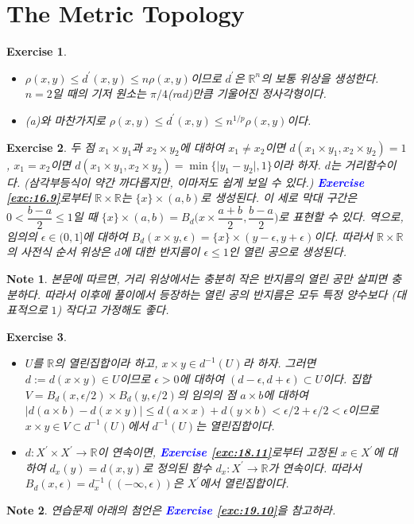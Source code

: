 \documentclass{article}
\newtheorem{exercise}{Exercise}[section]
\newtheorem*{note}{Note}
\newcommand{\R}{\mathbb{R}}
\begin{document}
\section{The Metric Topology}

\begin{exercise}
    \phantom{}
    \begin{itemize}
        \item[(a)] $\rho(x,y)\leq d^\prime(x,y)\leq n\rho(x,y)$이므로 $d^\prime$은 $\R^n$의 보통 위상을 생성한다. $n=2$일 때의 기저 원소는 $\pi/4$(rad)만큼 기울어진 정사각형이다.
        \item[(b)] (a)와 마찬가지로 $\rho(x,y)\leq d^\prime(x,y)\leq n^{1/p}\rho(x,y)$이다.
    \end{itemize}
\end{exercise}

\begin{exercise}
    두 점 $x_1\times y_1$과 $x_2\times y_2$에 대하여 $x_1\ne x_2$이면 $d(x_1\times y_1,x_2\times y_2)=1$, $x_1=x_2$이면 $d(x_1\times y_1,x_2\times y_2)=\min\{\vert y_1-y_2\vert,1\}$이라 하자. $d$는 거리함수이다. (삼각부등식이 약간 까다롭지만, 이마저도 쉽게 보일 수 있다.) \textcolor{blue}{\textbf{Exercise \ref{exc:16.9}}}로부터 $\R\times\R$는 $\{x\}\times (a,b)$로 생성된다. 이 세로 막대 구간은 $0<\dfrac{b-a}{2}\leq 1$일 때 $\{x\}\times(a,b)=B_d\biggl(x\times\dfrac{a+b}{2},\dfrac{b-a}{2}\biggr)$로 표현할 수 있다. 역으로, 임의의 $\epsilon\in(0,1]$에 대하여 $B_d(x\times y,\epsilon)=\{x\}\times(y-\epsilon,y+\epsilon)$이다. 따라서 $\R\times\R$의 사전식 순서 위상은 $d$에 대한 반지름이 $\epsilon\leq1$인 열린 공으로 생성된다.
\end{exercise}
\begin{note}
    본문에 따르면, 거리 위상에서는 충분히 작은 반지름의 열린 공만 살피면 충분하다. 따라서 이후에 풀이에서 등장하는 열린 공의 반지름은 모두 특정 양수보다 (대표적으로 $1$) 작다고 가정해도 좋다.
\end{note}

\begin{exercise}
	\label{exc:20.3}
    \phantom{}
    \begin{itemize}
        \item[(a)] $U$를 $\R$의 열린집합이라 하고, $x\times y\in d^{-1}(U)$라 하자. 그러면 $d:=d(x\times y)\in U$이므로 $\epsilon>0$에 대하여 $(d-\epsilon,d+\epsilon)\subset U$이다. 집합 $V=B_d(x,\epsilon/2)\times B_d(y,\epsilon/2)$의 임의의 점 $a\times b$에 대하여 $ \vert d(a\times b)-d(x\times y)\vert\leq d(a\times x)+d(y\times b)<\epsilon/2+\epsilon/2<\epsilon$이므로 $x\times y\in V\subset d^{-1}(U)$에서 $d^{-1}(U)$는 열린집합이다.
        \item[(b)] $d:X^\prime\times X^\prime\to\R$이 연속이면, \textcolor{blue}{\textbf{Exercise \ref{exc:18.11}}}로부터 고정된 $x\in X^\prime$에 대하여 $d_x(y)=d(x,y)$로 정의된 함수 $d_x:X^\prime\to\R$가 연속이다. 따라서 $B_d(x,\epsilon)=d_x^{-1}((-\infty,\epsilon))$은 $X^\prime$에서 열린집합이다.
    \end{itemize}
\end{exercise}
\begin{note}
    연습문제 아래의 첨언은 \textcolor{blue}{\textbf{Exercise \ref{exc:19.10}}}을 참고하라.
\end{note}
\end{document}
